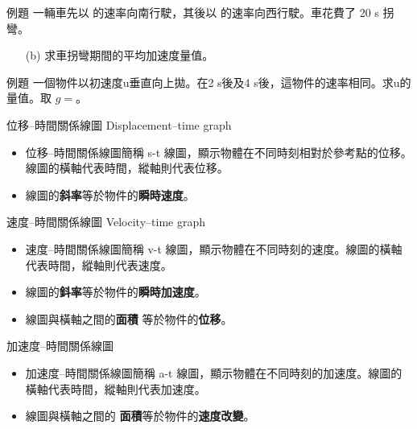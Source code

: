 \documentclass[beamer=true]{standalone}
\begin{document}
\begin{frame}[t]{例題}
    一輛車先以  的速率向南行駛，其後以  的速率向西行駛。車花費了 20 s 拐彎。
    \begin{itemize}
        \item [(b)]求車拐彎期間的平均加速度量值。
    \end{itemize}
\end{frame}
\begin{frame}[t]{例題}
    一個物件以初速度u垂直向上拋。在2 s後及4 s後，這物件的速率相同。求u的量值。取 $\mathit{g}=$。
\end{frame}

\begin{frame}{位移–時間關係線圖 Displacement–time graph}
    \begin{itemize}
        \item 位移–時間關係線圖簡稱 s-t 線圖，顯示物體在不同時刻相對於參考點的位移。線圖的橫軸代表時間，縱軸則代表位移。
        \item 線圖的\textbf{斜率}等於物件的\textbf{瞬時速度}。
    \end{itemize}
\end{frame}
\begin{frame}{速度–時間關係線圖 Velocity–time graph}
    \begin{itemize}
        \item 速度–時間關係線圖簡稱 v-t 線圖，顯示物體在不同時刻的速度。線圖的橫軸代表時間，縱軸則代表速度。
        \item 線圖的\textbf{鈄率}等於物件的\textbf{瞬時加速度}。
        \item 線圖與橫軸之間的\textbf{面積} 等於物件的\textbf{位移}。
    \end{itemize}
\end{frame}

\begin{frame}{加速度–時間關係線圖}
    \begin{itemize}
        \item 加速度–時間關係線圖簡稱 a-t 線圖，顯示物體在不同時刻的加速度。線圖的橫軸代表時間，縱軸則代表加速度。
        \item 線圖與橫軸之間的 \textbf{面積}等於物件的\textbf{速度改變}。
    \end{itemize}
\end{frame}
\end{document}
